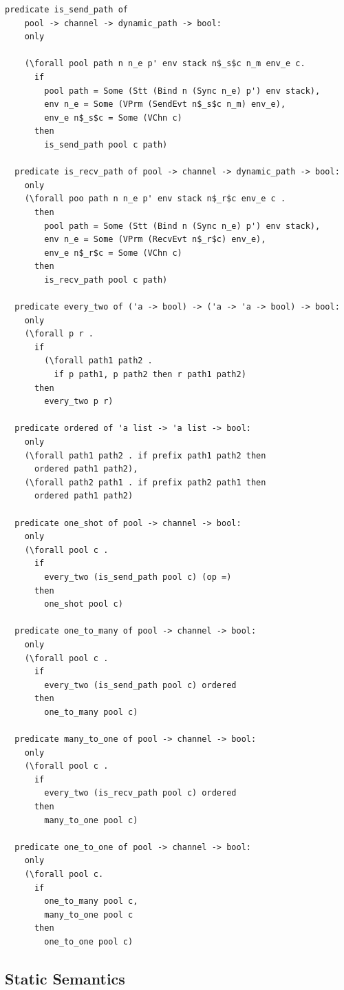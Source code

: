 \documentclass[10pt]{article}
\begin{document}
\begin{lstlisting}[language=logic, mathescape]
  predicate is_send_path of
    pool -> channel -> dynamic_path -> bool:
    only

    (\forall pool path n n_e p' env stack n$_s$c n_m env_e c.
      if
        pool path = Some (Stt (Bind n (Sync n_e) p') env stack),
        env n_e = Some (VPrm (SendEvt n$_s$c n_m) env_e), 
        env_e n$_s$c = Some (VChn c)
      then
        is_send_path pool c path)

  predicate is_recv_path of pool -> channel -> dynamic_path -> bool:
    only
    (\forall poo path n n_e p' env stack n$_r$c env_e c .
      then
        pool path = Some (Stt (Bind n (Sync n_e) p') env stack),
        env n_e = Some (VPrm (RecvEvt n$_r$c) env_e),
        env_e n$_r$c = Some (VChn c)
      then
        is_recv_path pool c path)

  predicate every_two of ('a -> bool) -> ('a -> 'a -> bool) -> bool:
    only
    (\forall p r .
      if
        (\forall path1 path2 .
          if p path1, p path2 then r path1 path2)
      then
        every_two p r)

  predicate ordered of 'a list -> 'a list -> bool:
    only
    (\forall path1 path2 . if prefix path1 path2 then
      ordered path1 path2),
    (\forall path2 path1 . if prefix path2 path1 then
      ordered path1 path2)

  predicate one_shot of pool -> channel -> bool:
    only
    (\forall pool c .
      if
        every_two (is_send_path pool c) (op =)
      then
        one_shot pool c)

  predicate one_to_many of pool -> channel -> bool:
    only
    (\forall pool c .
      if
        every_two (is_send_path pool c) ordered
      then
        one_to_many pool c)

  predicate many_to_one of pool -> channel -> bool:
    only
    (\forall pool c .
      if
        every_two (is_recv_path pool c) ordered
      then
        many_to_one pool c)

  predicate one_to_one of pool -> channel -> bool:
    only
    (\forall pool c.
      if
        one_to_many pool c,
        many_to_one pool c
      then
        one_to_one pool c)
  \end{lstlisting}


\subsection{Static Semantics}
\end{document}
